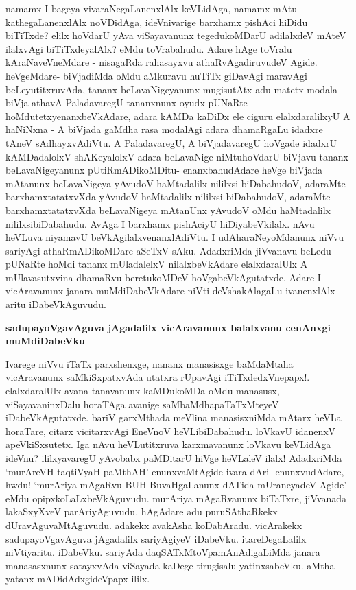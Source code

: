 \noindent
namamx I bageya vivaraNegaLanenxlAlx keVLidAga, namamx mAtu kathegaLanenxlAlx noVDi\-dAga, ideVniva\-rige barxhamx pishAci hiDidu biTiTxde? elilx hoVdarU yAva viSaya\-vanunx tegedukoMDarU adi\-lalxdeV mAteV ilalxvAgi biTiTxdeyalAlx? eMdu toVra\-bahudu. Adare hAge toVralu kAraNaveVneMdare - nisagaRda raha\-sayxvu athaR\-vAgadiruvudeV Agide. heVgeMdare- biVjadiMda oMdu aMkuravu huTiTx giDavAgi mara\-vAgi beLeyutitxruvAda, tananx beLavaNigeyanunx mugisutAtx adu matetx modala biVja athavA Palada\-varegU tananxnunx oyudx pUNaRte hoMdutetxyenanxbeVkAdare, adara kAMDa kaDiDx ele ciguru elalxda\-ralilxyU A haNiNxna - A biVjada gaMdha rasa modalAgi adara dhamaRgaLu idadxre tAneV sAdhayxvAdiVtu. A PaladavaregU, A biVjadavaregU hoVgade idadxrU kAMDadalolxV shAKeyalolxV adara beLa\-vaNige niMtuhoVdarU biVjavu tananx beLavaNigeyanunx pUtiRmADikoMDitu- enanxbahudAdare heVge biVjada mAtanunx beLavaNigeya yAvudoV haMtadalilx nililxsi biDa\-bahudoV, adaraMte barxhamxtatatxvXda yAvudoV haMtadalilx nililxsi biDabahudoV, adaraMte barxhamxtatatxvXda beLavaNigeya mAtanUnx yAvudoV oMdu haMtadalilx nililxsibiDabahudu. AvAga I barxhamx pishAciyU hiDiyabeVkilalx. nAvu heVLuva niya\-mavU beVkAgilalxvenanxlAdiVtu. I udAharaNeyoMdanunx niVvu sariyAgi athaRmADikoMDare aSeTxV sAku. AdadxriMda jiVvanavu beLedu pUNaRte hoMdi tananx mUladalelxV nilalxbeVkAdare elalxdaralUlx A mUla\-vasutxvina dhamaRvu beretukoMDeV hoVgabeVkAgutatxde. Adare I vicAravanunx janara muMdiDabeVkAdare niVti deVshakAlagaLu ivanenxlAlx aritu iDabeVkAguvudu.

{\bigskip
\noindent
{\large\bf sadupayoVgavAguva jAgadalilx vicAravanunx balalxvanu cenAnxgi muMdiDa\break\-beVku}}\label{page248}
\medskip

\noindent
Ivarege niVvu iTaTx parxshenxge, nananx manasisxge baMdaMtaha vicAravanunx saMkiSxpatxvAda utatxra rUpavAgi iTiTxdedxVnepapx!. elalxdaralUlx avana tanavanunx kaMDukoMDa oMdu manasusx, viSayavaninxDalu horaTAga avanige saMbaMdhapaTaTxMteyeV iDabeVkAgutatxde. bariV garxMthada meVlina manasisxniMda mAtarx heVLa hora\-Tare, citarx vicitarxvAgi EneVnoV heVLibiDabahudu. loVkavU idanenxV apeVkiSxsutetx. Iga nAvu heVLu\-titxruva karxmavanunx loVkavu keVLidAga ideVnu? ililxyavaregU yAvobabx paMDitarU hiVge heVLaleV ilalx! AdadxriMda `murAreVH taqtiVyaH paMthAH'\label{248} enunxvaMtAgide ivara dAri- enunxvudAdare, hwdu! `murAriya mAgaRvu BUH BuvaHgaLanunx dATida mUraneyadeV Agide' eMdu opipxkoLaLxbeVkAgu\-vudu. murAriya mAgaRvanunx biTaTxre, jiVvanada lakaSxyXveV parAriyAguvudu. hAgAdare adu puru\-SAthaRkekx dUravAguvaMtAguvudu. adakekx avakAsha koDabAradu. vicArakekx sadupayoVgavAguva jAgadalilx sariyAgiyeV iDabeVku. itareDegaLalilx niVtiyaritu. iDabeVku. sariyAda daqSATxMtoVpa\-mAnAdigaLiMda janara manasasxnunx satayxvAda viSayada kaDege tirugisalu yatinxsabeVku. aMtha yatanx mADidAdxgideVpapx ililx.

